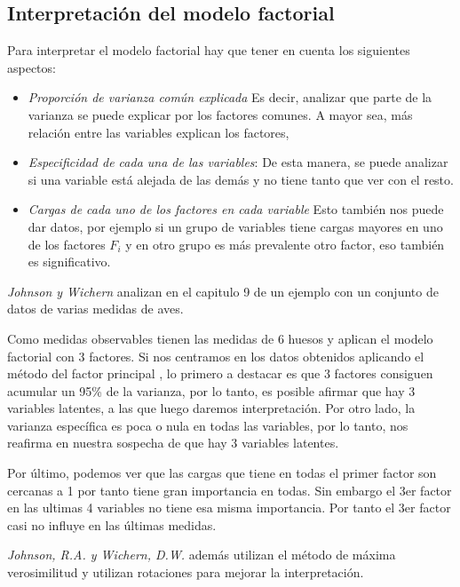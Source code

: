\subsection{Interpretación del modelo factorial}

\noindent Para interpretar el modelo factorial hay que tener en cuenta los siguientes aspectos:
\begin{itemize}
\item \emph{Proporción de varianza común explicada} Es decir, analizar que parte de la varianza se puede explicar por los factores comunes. A mayor sea, más relación entre las variables explican los factores, 
\item \emph{Especificidad de cada una de las variables}: De esta manera, se puede analizar si una variable está alejada de las demás y no tiene tanto que ver con el resto. 
\item \emph{Cargas de cada uno de los factores en cada variable} Esto también nos puede dar datos, por ejemplo si un grupo de variables tiene cargas mayores en uno de los factores $F_i$ y en otro grupo es más prevalente otro factor, eso también es significativo. 
\end{itemize}

\noindent \emph{Johnson y Wichern } analizan en el capitulo 9 de \cite{Johnson 2007} un ejemplo con un conjunto de datos de varias medidas de aves. 

\noindent Como medidas observables tienen las medidas de 6 huesos y aplican el modelo factorial con 3 factores. Si nos centramos en los datos obtenidos aplicando el método del factor principal \cite{Peña 2002, Johnson 2007}, lo primero a destacar es que 3 factores consiguen acumular un 95\% de la varianza, por lo tanto, es posible afirmar que hay 3 variables latentes, a las que luego daremos interpretación. Por otro lado, la varianza específica es poca o nula en todas las variables, por lo tanto, nos reafirma en nuestra sospecha de que hay 3 variables latentes. 

\noindent Por último, podemos ver que las cargas que tiene en todas el primer factor son cercanas a 1 por tanto tiene gran importancia en todas. Sin embargo el 3er factor en las ultimas 4 variables no tiene esa misma importancia. Por tanto el 3er factor casi no influye en las últimas medidas. 

\noindent \emph{Johnson, R.A. y Wichern, D.W.}\cite{Johnson 2007} además utilizan el método de máxima verosimilitud y utilizan rotaciones para mejorar la interpretación. 

